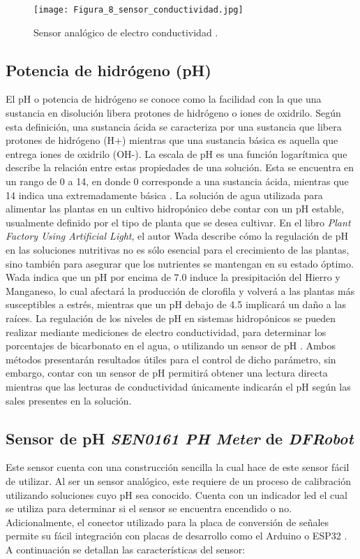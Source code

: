 \begin{figure}[H]
	\centering
	\texttt{[image: Figura\_8\_sensor\_conductividad.jpg]}
	\caption{Sensor analógico de electro conductividad \cite{DFRobot_ECsensor}.}
	\label{fig:mesh8}
\end{figure}

\subsection{Potencia de hidrógeno (pH)}
El pH o potencia de hidrógeno se conoce como la facilidad con la que una sustancia en disolución libera protones de hidrógeno o iones de oxidrilo. Según esta definición, una sustancia ácida se caracteriza por una sustancia que libera protones de hidrógeno (H+) mientras que una sustancia básica es aquella que entrega iones de oxidrilo (OH-). La escala de pH es una función logarítmica que describe la relación entre estas propiedades de una solución. Esta se encuentra en un rango de 0 a 14, en donde 0 corresponde a una sustancia ácida, mientras que 14 indica una extremadamente básica \cite{chang_quimica_1995}. La solución de agua utilizada para alimentar las plantas en un cultivo hidropónico debe contar con un pH estable, usualmente definido por el tipo de planta que se desea cultivar. En el libro \textit{Plant Factory Using Artificial Light}, el autor Wada describe cómo la regulación de pH en las soluciones nutritivas no es sólo esencial para el crecimiento de las plantas, sino también para asegurar que los nutrientes se mantengan en su estado óptimo. Wada indica que un pH por encima de 7.0 induce la presipitación del Hierro y Manganeso, lo cual afectará la producción de clorofila y volverá a las plantas más susceptibles a estrés, mientras que un pH debajo de 4.5 implicará un daño a las raíces. La regulación de los niveles de pH en sistemas hidropónicos se pueden realizar mediante mediciones de electro conductividad, para determinar los porcentajes de bicarbonato en el agua, o utilizando un sensor de pH \cite{wada_theory_2019}. Ambos métodos presentarán resultados útiles para el control de dicho parámetro, sin embargo, contar con un sensor de pH permitirá obtener una lectura directa mientras que las lecturas de conductividad únicamente indicarán el pH según las sales presentes en la solución.

\subsection{Sensor de pH \textit{SEN0161 PH Meter} de \textit{DFRobot}}
Este sensor cuenta con una construcción sencilla la cual hace de este sensor fácil de utilizar. Al ser un sensor analógico, este requiere de un proceso de calibración utilizando soluciones cuyo pH sea conocido. Cuenta con un indicador led el cual se utiliza para determinar si el sensor se encuentra encendido o no. Adicionalmente, el conector utilizado para la placa de conversión de señales permite su fácil integración con placas de desarrollo como el Arduino o ESP32 \cite{DFRobot_PHsensor}. A continuación se detallan las características del sensor:

